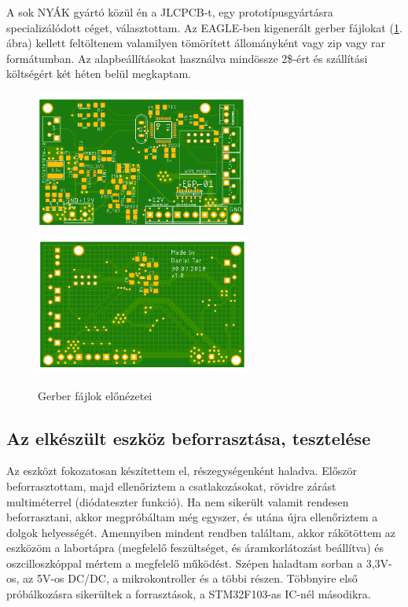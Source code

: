\documentclass[../main.tex]{subfiles}
\begin{document}
            A sok NYÁK gyártó közül én a JLCPCB-t, egy prototípusgyártásra specializálódott céget, választottam. Az EAGLE-ben kigenerált gerber fájlokat (\ref{fig:gerber_v10}. ábra) kellett feltöltenem valamilyen tömörített állományként vagy zip vagy rar formátumban. Az alapbeállításokat használva mindössze 2\$-ért és szállítási költségért két héten belül megkaptam.
            
            \begin{figure}[h!]
                \centering
                    \includegraphics[width=7cm]{resources/pcb_res/pcb_top_v10.png}
                    \includegraphics[width=7cm]{resources/pcb_res/pcb_bottom_v10.png}
                \caption{Gerber fájlok előnézetei}
                \label{fig:gerber_v10}
            \end{figure}

    \subsection{Az elkészült eszköz beforrasztása, tesztelése}
        Az eszközt fokozatosan készítettem el, részegységenként haladva. Először beforrasztottam, majd ellenőriztem a csatlakozásokat, rövidre zárást multiméterrel (diódateszter funkció). Ha nem sikerült valamit rendesen beforrasztani, akkor megpróbáltam még egyszer, és utána újra ellenőriztem a dolgok helyességét. Amennyiben mindent rendben találtam, akkor rákötöttem az eszközöm a labortápra (megfelelő feszültséget, és áramkorlátozást beállítva) és oszcilloszkóppal mértem a megfelelő működést. Szépen haladtam sorban a 3,3V-os, az 5V-os DC/DC, a mikrokontroller és a többi részen. Többnyire első próbálkozásra sikerültek a forrasztások, a STM32F103-as IC-nél másodikra.
        
\end{document}

